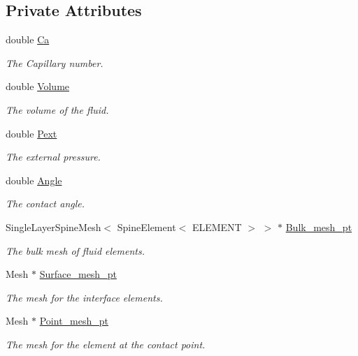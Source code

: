\subsection*{Private Attributes}
\begin{DoxyCompactItemize}
\item 
double \hyperlink{classCapProblem_ad856df0aa70d881a2b2bc81ad4e2e251}{Ca}
\begin{DoxyCompactList}\small\item\em The Capillary number. \end{DoxyCompactList}\item 
double \hyperlink{classCapProblem_ab1f403fd3be7648c3a52a66684a78f7e}{Volume}
\begin{DoxyCompactList}\small\item\em The volume of the fluid. \end{DoxyCompactList}\item 
double \hyperlink{classCapProblem_a6fcc40a7331c00739923b49c167b396f}{Pext}
\begin{DoxyCompactList}\small\item\em The external pressure. \end{DoxyCompactList}\item 
double \hyperlink{classCapProblem_a7a57e45e3f1b7d30ae9d99bff56e8f5d}{Angle}
\begin{DoxyCompactList}\small\item\em The contact angle. \end{DoxyCompactList}\item 
Single\+Layer\+Spine\+Mesh$<$ Spine\+Element$<$ E\+L\+E\+M\+E\+NT $>$ $>$ $\ast$ \hyperlink{classCapProblem_a6d74594a707d89fc3fd5b87bf1c26a5b}{Bulk\+\_\+mesh\+\_\+pt}
\begin{DoxyCompactList}\small\item\em The bulk mesh of fluid elements. \end{DoxyCompactList}\item 
Mesh $\ast$ \hyperlink{classCapProblem_a557ef36f2db33b81fb3e1828365e66a0}{Surface\+\_\+mesh\+\_\+pt}
\begin{DoxyCompactList}\small\item\em The mesh for the interface elements. \end{DoxyCompactList}\item 
Mesh $\ast$ \hyperlink{classCapProblem_ad1ee833de811bacb3ba3bd9630fe4154}{Point\+\_\+mesh\+\_\+pt}
\begin{DoxyCompactList}\small\item\em The mesh for the element at the contact point. \end{DoxyCompactList}\item 

\end{DoxyCompactItemize}
